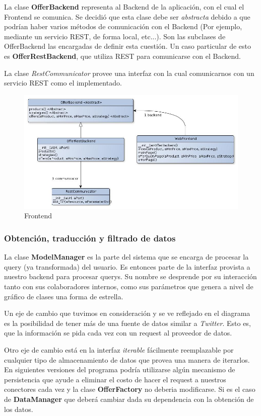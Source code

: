 \documentclass[10pt, a4paper]{article}
\begin{document}
La clase \textbf{OfferBackend} representa al Backend de la aplicación, con el cual el Frontend se comunica. Se decidió que esta clase debe ser \emph{abstracta} debido a que podrían haber varios métodos de comunicación con el Backend (Por ejemplo, mediante un servicio REST, de forma local, etc...). Son las subclases de OfferBackend las encargadas de definir esta cuestión. Un caso particular de esto es \textbf{OfferRestBackend}, que utiliza REST para comunicarse con el Backend. 

La clase \emph{RestCommunicator} provee una interfaz con la cual comunicarnos con un servicio REST como el implementado. 

\begin{figure}[H]
\centering
\includegraphics[scale=0.6]{graphics/frontend_class.jpg}
\caption{Frontend}
\end{figure}
\newpage


\subsubsection{Obtenci\'on, traducci\'on y filtrado de datos}
La clase \textbf{ModelManager} es la parte del sistema que se encarga de procesar la query (ya transformada) del usuario. Es entonces parte de la interfaz provista a nuestro backend para procesar querys. Su nombre se desprende por su interacción tanto con sus colaboradores internos, como sus parámetros que genera a nivel de gráfico de clases una forma de estrella.

Un eje de cambio que tuvimos en consideración y se ve reflejado en el diagrama es la posibilidad de tener más de una fuente de datos similar a \emph{Twitter}. Esto es, que la informaci\'on se pida cada vez con un request al proveedor de datos.

Otro eje de cambio est\'a en la interfaz \emph{iterable} fácilmente reemplazable por cualquier tipo de almacenamiento de datos que provea una manera de iterarlos. En siguientes versiones del programa podría utilizarse algún mecanismo de persistencia que ayude a eliminar el costo de hacer el request a nuestros conectores cada vez y la clase \textbf{OfferFactory} no deberia modificarse. Si es el caso de \textbf{DataManager} que deberá cambiar dada su dependencia con la obtenci\'on de los datos.
\end{document}
